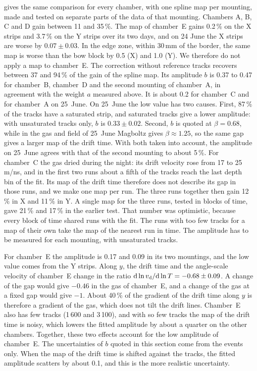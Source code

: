  gives the same comparison for every chamber, with one spline map per mounting, made and tested on
separate parts of the data of that mounting. Chambers A, B, C and D gain between 11 and 35\,\%. The map of chamber~E gains 0.2\,\% on the X strips and
3.7\,\% on the Y strips over its two days, and on 24 June the X strips are worse by $0.07\pm0.03$\textdegree. In the
edge zone, within 30\,mm of the border, the same map is worse than the bow block by 0.5\textdegree{} (X) and
1.0\textdegree{} (Y). We therefore do not apply a map to chamber~E. The correction without reference tracks
recovers between 37 and 94\,\% of the gain of the spline map.
Its amplitude $b$ is 0.37 to 0.47 for chamber~B, chamber~D and the second mounting of chamber~A, in agreement with the
weight $a$ measured above. It is about 0.2 for chamber~C and for chamber~A on 25~June. On 25~June the low value has
two causes. First, 87\,\% of the tracks have a saturated strip, and saturated tracks give a lower amplitude: with
unsaturated tracks only, $b$ is $0.33\pm0.02$. Second, $b$ is quoted at $\beta=0.68$, while in the gas and field of
25~June Magboltz gives $\beta\approx1.25$, so the same gap gives a larger map of the drift time. With both taken into
account, the amplitude on 25~June agrees with that of the second mounting to about 5\,\%. For chamber~C the gas dried during the night: its drift
velocity rose from 17 to 25\,\textmu m/ns, and in the first two runs about a fifth of the tracks reach the last
depth bin of the fit. Its map of the drift time therefore does not describe its gap in those runs, and we make one map
per run. The three runs together then gain 12\,\% in X and 11\,\% in Y. A single map for the three runs, tested
in blocks of time, gave 21\,\% and 17\,\% in the earlier test. That number was optimistic, because every block of
time shared runs with the fit. The runs with too few tracks for a map of their own take the map of the nearest run in
time. The amplitude has to be measured for each mounting, with
unsaturated tracks.

For chamber~E the amplitude is 0.17 and 0.09 in its two mountings, and the low value comes from the Y strips. Along
$y$, the drift time and the angle-scale velocity of chamber~E change in the ratio
$\mathrm{d}\ln v_\mathrm{d}/\mathrm{d}\ln T=-0.68\pm0.09$. A change of the gap would give $-0.46$ in the gas of chamber~E, and a
change of the gas at a fixed gap would give $-1$. About 40\,\% of the gradient of the drift time along $y$ is therefore
a gradient of the gas, which does not tilt the drift lines. Chamber~E also has few tracks (1\,600 and 3\,100), and
with so few tracks the map of the drift time is noisy, which lowers the fitted amplitude by about a quarter on the
other chambers. Together, these two effects account for the low amplitude of chamber~E. The uncertainties of $b$ quoted
in this section come from the events only. When the map of the drift time is shifted against the tracks, the fitted
amplitude scatters by about 0.1, and this is the more realistic uncertainty.

